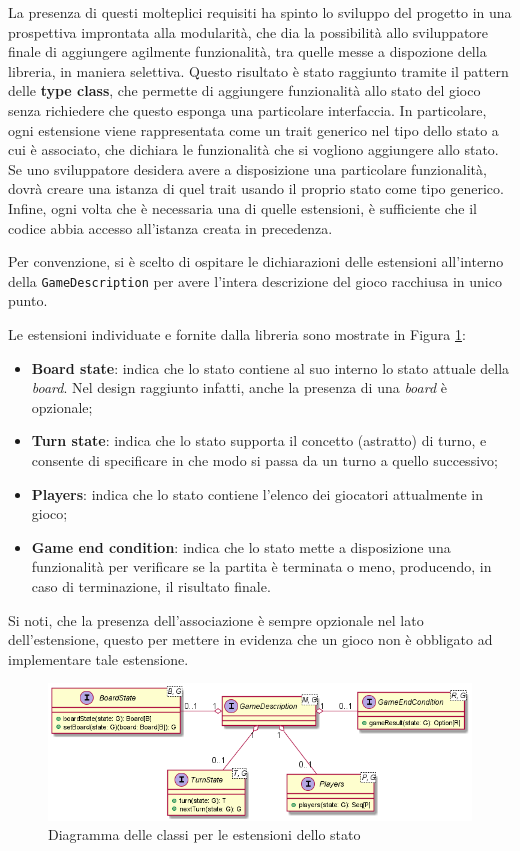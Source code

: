 La presenza di questi molteplici requisiti ha spinto lo sviluppo del progetto in una prospettiva improntata alla modularità, che dia la possibilità allo sviluppatore finale di aggiungere agilmente funzionalità, tra quelle messe a dispozione della libreria, in maniera selettiva.
%
Questo risultato è stato raggiunto tramite il pattern delle \textbf{type class}, che permette di aggiungere funzionalità allo stato del gioco senza richiedere che questo esponga una particolare interfaccia.
%
In particolare, ogni estensione viene rappresentata come un trait generico nel tipo dello stato a cui è associato, che dichiara le funzionalità che si vogliono aggiungere allo stato.
%
Se uno sviluppatore desidera avere a disposizione una particolare funzionalità, dovrà creare una istanza di quel trait usando il proprio stato come tipo generico.
%
Infine, ogni volta che è necessaria una di quelle estensioni, è sufficiente che il codice abbia accesso all'istanza creata in precedenza.

Per convenzione, si è scelto di ospitare le dichiarazioni delle estensioni all'interno della \texttt{GameDescription} per avere l'intera descrizione del gioco racchiusa in unico punto.

Le estensioni individuate e fornite dalla libreria sono mostrate in Figura \ref{fig:extensions}:
%
\begin{itemize}
    \item \textbf{Board state}: indica che lo stato contiene al suo interno lo stato attuale della \textit{board}. Nel design raggiunto infatti, anche la presenza di una \textit{board} è opzionale;
    \item \textbf{Turn state}: indica che lo stato supporta il concetto (astratto) di turno, e consente di specificare in che modo si passa da un turno a quello successivo;
    \item \textbf{Players}: indica che lo stato contiene l'elenco dei giocatori attualmente in gioco;
    \item \textbf{Game end condition}: indica che lo stato mette a disposizione una funzionalità per verificare se la partita è terminata o meno, producendo, in caso di terminazione, il risultato finale.
\end{itemize}
%
Si noti, che la presenza dell'associazione è sempre opzionale nel lato dell'estensione, questo per mettere in evidenza che un gioco non è obbligato ad implementare tale estensione.
%
\begin{figure}
    \centering
    \includegraphics[width=\linewidth]{images/uml/extensions.png}
    \caption{Diagramma delle classi per le estensioni dello stato}
    \label{fig:extensions}
\end{figure}

